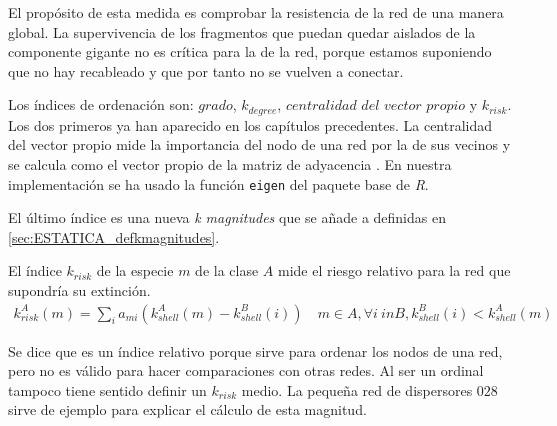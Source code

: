 El propósito de esta medida es comprobar la resistencia de la red de una manera global. La supervivencia de los fragmentos que puedan quedar aislados de la componente gigante no es crítica para la de la red, porque estamos suponiendo que no hay recableado y que por tanto no se vuelven a conectar.

Los índices de ordenación son: $grado$, ${k}_{degree}$, $centralidad$ $del$ $vector$ $propio$ y ${k}_{risk}$. Los dos primeros ya han aparecido en los capítulos precedentes. La centralidad del vector propio mide la importancia del nodo de una red por la de sus vecinos y se calcula como el vector propio de la matriz de adyacencia \cite{newman2008mathematics}. En nuestra implementación se ha usado la función \texttt{eigen} del paquete base de \textit{R}.

El último índice es una nueva \textit{k magnitudes} que se añade a definidas en \ref{sec:ESTATICA_defkmagnitudes}. 

\begin{theo} 
El índice \textit{$k_{risk}$} de la especie $m$ de la clase $A$ mide el riesgo relativo para la red que supondría su extinción.
\begin{align*}
k^A_{risk}\left(m\right) = \sum\limits_{i} a_{mi} \left(k^A_{shell}\left(m\right) - k^B_{shell}\left(i\right)\right)\quad   m \in A, \forall i\: in B, k^B_{shell}\left(i\right) < k^A_{shell}\left(m\right)
\end{align*}
\label{krisk}
\end{theo}

Se dice que es un índice relativo porque sirve para ordenar los nodos de una red, pero no es válido para hacer comparaciones con otras redes. Al ser un ordinal tampoco tiene sentido definir un $k_{risk}$ medio. La pequeña red de dispersores $028$ sirve de ejemplo para explicar el cálculo de esta magnitud.

